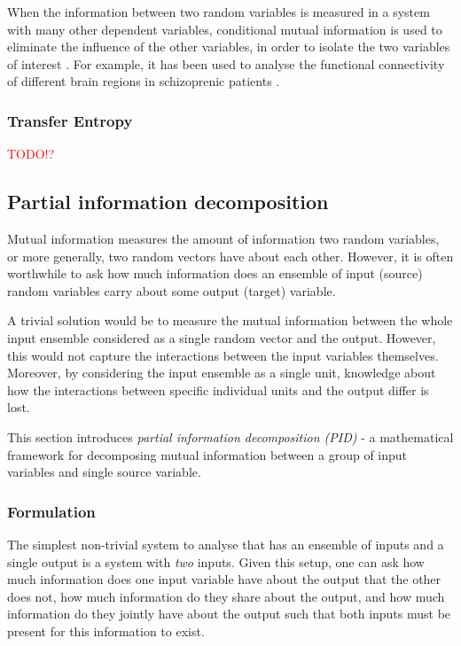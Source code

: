 \documentclass[12pt]{article}
\begin{document}
When the information between two random variables is measured in a system with many other dependent variables, conditional mutual information is used to eliminate the influence of the other variables, in order to isolate the two variables of interest \cite{williams-beer}. For example, it has been used to analyse the functional connectivity of different brain regions in schizoprenic patients \cite{brain-cond-inf}.

\subsubsection{Transfer Entropy}
\textcolor{red}{TODO!?}

\newpage
\subsection{Partial information decomposition}

Mutual information measures the amount of information two random variables, or more generally, two random vectors have about each other. However, it is often worthwhile to ask how much information does an ensemble of input (source) random variables carry about some output (target) variable. 

A trivial solution would be to measure the mutual information between the whole input ensemble considered as a single random vector and the output. However, this would not capture the interactions between the input variables themselves. Moreover, by considering the input ensemble as a single unit, knowledge about how the interactions between specific individual units and the output differ is lost. 

This section introduces \textit{partial information decomposition (PID)} - a mathematical framework for decomposing mutual information between a group of input variables and single source variable.   

\subsubsection{Formulation}

The simplest non-trivial system to analyse that has an ensemble of inputs and a single output is a system with \textit{two} inputs. Given this setup, one can ask how much information does one input variable have about the output that the other does not, how much information do they share about the output, and how much information do they jointly have about the output such that both inputs must be present for this information to exist.
\end{document}
